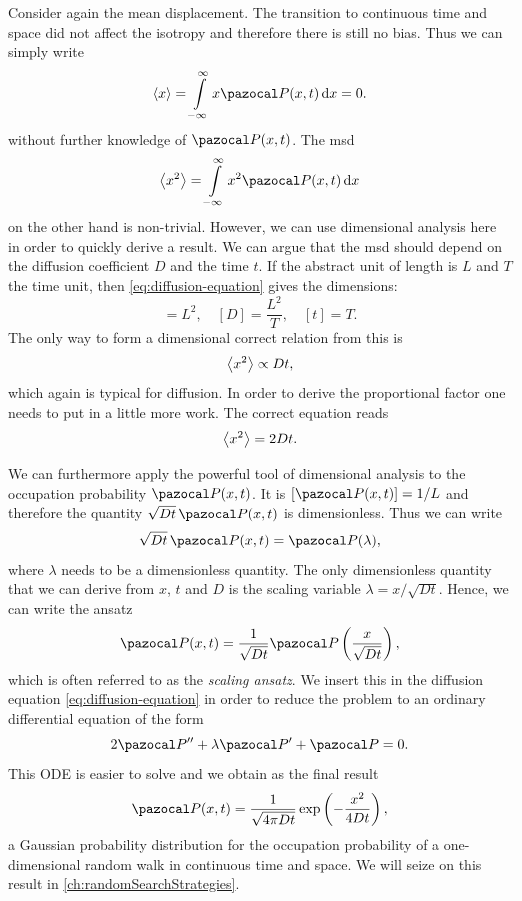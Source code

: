 Consider again the mean displacement. The transition to continuous time and space did not affect the isotropy and therefore there is still no bias. Thus we can simply write
\begin{equation*}
 \avg{x} = \int\limits_{-\infty}^\infty x \P(x, t) \diff x = 0.
\end{equation*}
without further knowledge of $\P(x, t)$. The \ac{msd}
\begin{equation*}
 \avg{x^2} = \int\limits_{-\infty}^\infty x^2 \P(x, t) \diff x
\end{equation*}
on the other hand is non-trivial. However, we can use dimensional analysis here in order to quickly derive a result. We can argue that the \ac{msd} should depend on the diffusion coefficient $D$ and the time $t$. If the abstract unit of length is $L$ and $T$ the time unit, then \autoref{eq:diffusion-equation} gives the dimensions:
\begin{equation*}
 [\avg{x^2}] = L^2, \quad [D] = \dfrac{L^2}{T}, \quad [t] = T.
\end{equation*}
The only way to form a dimensional correct relation from this is
\begin{equation*}
 \left<x^2\right> \propto Dt,
\end{equation*}
which again is typical for diffusion. In order to derive the proportional factor one needs to put in a little more work. The correct equation reads
\begin{equation*}
 \left<x^2\right> = 2Dt.
\end{equation*}

We can furthermore apply the powerful tool of dimensional analysis to the occupation probability $\P(x, t)$. It is $[\P(x, t)] = 1/L$ and therefore the quantity $\sqrt{Dt} \, \P(x, t)$ is dimensionless. Thus we can write
\begin{equation*}
 \sqrt{Dt} \, \P(x, t) = \P(\lambda),
\end{equation*}
where $\lambda$ needs to be a dimensionless quantity. The only dimensionless quantity that we can derive from $x$, $t$ and $D$ is the scaling variable $\lambda = x / \sqrt{Dt}$.  Hence, we can write the ansatz
\begin{equation*}
 \P(x, t) = \dfrac{1}{\sqrt{Dt}} \P\left(\dfrac{x}{\sqrt{Dt}}\right),
\end{equation*}
which is often referred to as the \textit{scaling ansatz}. We insert this in the diffusion equation \ref{eq:diffusion-equation} in order to reduce the problem to an ordinary differential equation of the form
\begin{equation*}
 2\P'' + \lambda \P' + \P = 0.
\end{equation*}
This ODE is easier to solve and we obtain as the final result 
\begin{equation}\label{eq:gauss-distr}
 \P(x, t) = \dfrac{1}{\sqrt{4 \pi Dt}} \exp\left(-\dfrac{x^2}{4Dt}\right),
\end{equation}
a Gaussian probability distribution for the occupation probability of a one-dimensional random walk in continuous time and space. We will seize on this result in \autoref{ch:randomSearchStrategies}.


